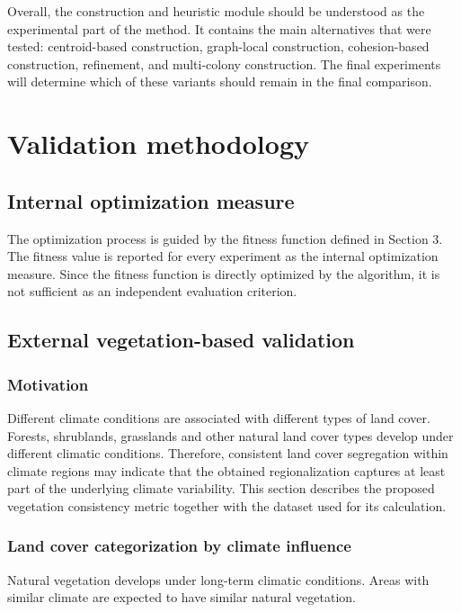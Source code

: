 \documentclass[11pt]{article}
\begin{document}
Overall, the construction and heuristic module should be understood as the experimental part of the method. It contains the main alternatives that were tested: centroid-based construction, graph-local construction, cohesion-based construction, refinement, and multi-colony construction. The final experiments will determine which of these variants should remain in the final comparison.



\section{Validation methodology}
\label{sec:validation}

\subsection{Internal optimization measure}
The optimization process is guided by the fitness function defined in Section 3. The fitness value is reported for every experiment as the internal optimization measure. Since the fitness function is directly optimized by the algorithm, it is not sufficient as an independent evaluation criterion.


\subsection{External vegetation-based validation}
\subsubsection{Motivation}
Different climate conditions are associated with different types of land cover. Forests, shrublands, grasslands and other natural land cover types develop under different climatic conditions. Therefore, consistent land cover segregation within climate regions may indicate that the obtained regionalization captures at least part of the underlying climate variability. This section describes the proposed vegetation consistency metric together with the dataset used for its calculation.


\subsubsection{Land cover categorization by climate influence}
Natural vegetation develops under long-term climatic conditions. Areas with similar climate are expected to have similar natural vegetation.
\end{document}
